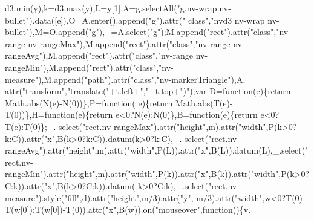 \begin{DoxyCode}
      d3.min(y),k=d3.max(y),L=y[1],A=g.selectAll(\textcolor{stringliteral}{"g.nv-wrap.nv-bullet"}).data([e]),O=A.enter().append(\textcolor{stringliteral}{"g"}).attr(\textcolor{stringliteral}{"
      class"},\textcolor{stringliteral}{"nvd3 nv-wrap nv-bullet"}),M=O.append(\textcolor{stringliteral}{"g"}),\_=A.select(\textcolor{stringliteral}{"g"});M.append(\textcolor{stringliteral}{"rect"}).attr(\textcolor{stringliteral}{"class"},\textcolor{stringliteral}{"nv-range
       nv-rangeMax"}),M.append(\textcolor{stringliteral}{"rect"}).attr(\textcolor{stringliteral}{"class"},\textcolor{stringliteral}{"nv-range nv-rangeAvg"}),M.append(\textcolor{stringliteral}{"rect"}).attr(\textcolor{stringliteral}{"class"},\textcolor{stringliteral}{"nv-range
       nv-rangeMin"}),M.append(\textcolor{stringliteral}{"rect"}).attr(\textcolor{stringliteral}{"class"},\textcolor{stringliteral}{"nv-measure"}),M.append(\textcolor{stringliteral}{"path"}).attr(\textcolor{stringliteral}{"class"},\textcolor{stringliteral}{"nv-markerTriangle"}),A.
      attr(\textcolor{stringliteral}{"transform"},\textcolor{stringliteral}{"translate("}+t.left+\textcolor{stringliteral}{","}+t.top+\textcolor{stringliteral}{")"});var D=\textcolor{keyword}{function}(e)\{\textcolor{keywordflow}{return} Math.abs(N(e)-N(0))\},P=\textcolor{keyword}{function}(
      e)\{\textcolor{keywordflow}{return} Math.abs(T(e)-T(0))\},H=\textcolor{keyword}{function}(e)\{\textcolor{keywordflow}{return} e<0?N(e):N(0)\},B=function(e)\{\textcolor{keywordflow}{return} e<0?T(e):T(0)\};\_.
      select(\textcolor{stringliteral}{"rect.nv-rangeMax"}).attr(\textcolor{stringliteral}{"height"},m).attr(\textcolor{stringliteral}{"width"},P(k>0?k:C)).attr(\textcolor{stringliteral}{"x"},B(k>0?k:C)).datum(k>0?k:C),\_.
      select(\textcolor{stringliteral}{"rect.nv-rangeAvg"}).attr(\textcolor{stringliteral}{"height"},m).attr(\textcolor{stringliteral}{"width"},P(L)).attr(\textcolor{stringliteral}{"x"},B(L)).datum(L),\_.select(\textcolor{stringliteral}{"
      rect.nv-rangeMin"}).attr(\textcolor{stringliteral}{"height"},m).attr(\textcolor{stringliteral}{"width"},P(k)).attr(\textcolor{stringliteral}{"x"},B(k)).attr(\textcolor{stringliteral}{"width"},P(k>0?C:k)).attr(\textcolor{stringliteral}{"x"},B(k>0?C:k)).datum(
      k>0?C:k),\_.select(\textcolor{stringliteral}{"rect.nv-measure"}).style(\textcolor{stringliteral}{"fill"},d).attr(\textcolor{stringliteral}{"height"},m/3).attr(\textcolor{stringliteral}{"y"},
      m/3).attr(\textcolor{stringliteral}{"width"},w<0?T(0)-T(w[0]):T(w[0])-T(0)).attr(\textcolor{stringliteral}{"x"},B(w)).on(\textcolor{stringliteral}{"mouseover"},\textcolor{keyword}{function}()\{v.

\end{DoxyCode}
